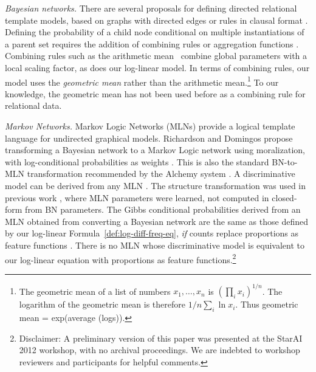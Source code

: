 \documentclass[runningheads,a4paper]{llncs}
\begin{document}
\emph{Bayesian networks.} There are several proposals for defining directed relational template models, based on graphs with directed edges or rules in clausal format \cite{Kersting2007,Getoor2007c}. Defining the probability of a child node conditional on multiple instantiations of a parent set requires the addition of combining rules \cite{Kersting2007} or aggregation functions \cite{Getoor2007c}. 
Combining rules such as the arithmetic mean~\cite{Natarajan2008} combine global parameters with a local scaling factor, as does our log-linear model. In terms of combining rules,  our model uses the {\em geometric mean} rather than the arithmetic mean.\footnote{The geometric mean of a list of numbers $x_{1},\ldots,x_{n}$ is $(\prod_{i} x_{i})^{1/n}$. The logarithm of the geometric mean is therefore $1/n \sum_{i} \ln x_{i}$. Thus geometric mean = exp(average (logs)).} To our knowledge, the geometric mean has not been used before as a combining rule for relational data.  

\emph{Markov Networks.} Markov Logic Networks (MLNs) provide a logical template language for undirected graphical models. 
Richardson and Domingos propose transforming a Bayesian network to a Markov Logic network using moralization, with log-conditional probabilities as weights \cite{Domingos2009}. 
This is also the standard BN-to-MLN transformation recommended by the Alchemy system \cite{bib:bayes-convert}. A discriminative model can be derived from any MLN \cite{Domingos2009}.  The structure transformation was used in previous work \cite{Schulte2012}, where MLN parameters were learned, not computed in closed-form from BN parameters. The Gibbs conditional probabilities derived from an MLN obtained from converting a Bayesian network are the same as those defined by our log-linear Formula~\ref{def:log-diff-freq-eq}, {\em if} counts replace proportions as feature functions \cite{Schulte2011}. There is no MLN whose discriminative model is equivalent to our log-linear equation with  proportions as feature functions.\footnote{Disclaimer: A preliminary version of this paper was presented at the StarAI 2012 workshop, with no archival proceedings. We are indebted to workshop reviewers and participants for helpful comments.}
 
\end{document}
